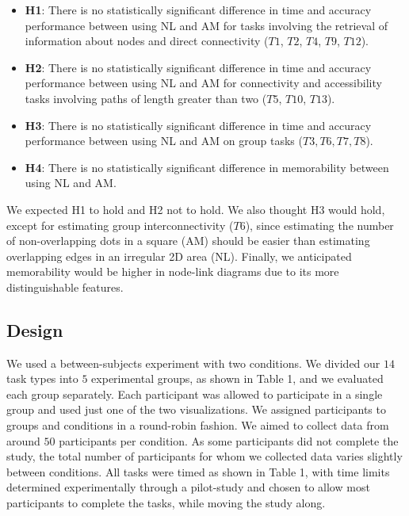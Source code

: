 \begin{itemize}
\item[] \textbf{H1}: There is no statistically significant difference in time and accuracy performance between using NL and AM for tasks involving the retrieval of information about nodes and direct connectivity ($T1$, $T2$, $T4$, $T9$, $T12$). 

\item[] \textbf{H2}: There is no statistically significant difference in time and accuracy performance between using NL and AM for connectivity and accessibility tasks involving paths of length greater than two ($T5$, $T10$, $T13$). 

\item[] \textbf{H3}: There is no statistically significant difference in time and accuracy performance between using NL and AM on group tasks ($T3,T6,T7,T8$).

\item[] \textbf{H4}: There is no statistically significant difference in memorability between using NL and AM.

\end{itemize}

\noindent We expected H1 to hold and H2 not to hold. We also thought H3 would hold, except for estimating group interconnectivity ($T6$), since estimating the number of non-overlapping dots in a square (AM) should be easier than estimating overlapping edges in an irregular 2D area (NL). Finally, we anticipated memorability would be higher in node-link diagrams due to its more distinguishable features.

\subsection{Design}

We used a between-subjects experiment with two conditions. We divided our $14$ task types into $5$ experimental groups, as shown in Table 1, and we evaluated each group separately. Each participant was allowed to participate in a single group and used just one of the two visualizations. We assigned participants to groups and conditions in a round-robin fashion. We aimed to collect data from around $50$ participants per condition. As  some participants did not complete the study, the total number of participants for whom we collected data varies slightly between conditions. 
All tasks were timed as shown in Table 1, with time limits determined experimentally through a pilot-study and chosen to allow most participants to complete the tasks, while moving the study along.  

